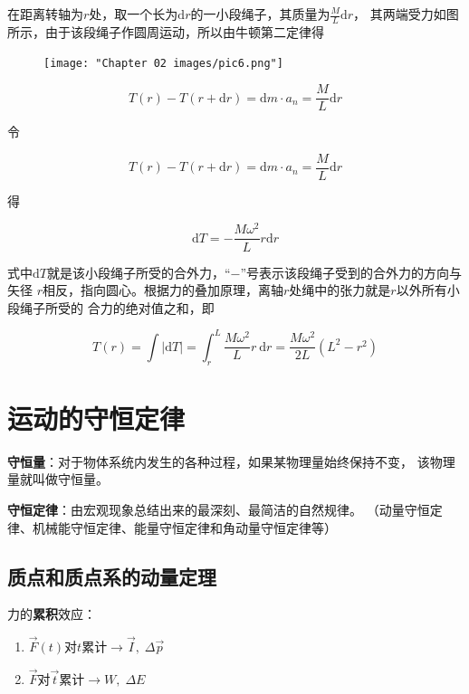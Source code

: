 \documentclass[
	12pt, %
	a4paper, %
]{myLegrandOrangeBook}
\newcommand{\rmd}{\mathrm{d}}
\begin{document}
    在距离转轴为\(r\)处，取一个长为\(\rmd r\)的一小段绳子，其质量为\(\frac{M}{L} \rmd r\)，
    其两端受力如图所示，由于该段绳子作圆周运动，所以由牛顿第二定律得

    \begin{figure}
        \centering
        \texttt{[image: "Chapter 02 images/pic6.png"]}
        \label{pic6}
    \end{figure}

    $$
        T(r)-T(r+\rmd r)=\rmd m \cdot a_n=\frac{M}{L} \rmd r
    $$

    令

    $$
        T(r)-T(r+\rmd r)=\rmd m \cdot a_n=\frac{M}{L} \rmd r
    $$

    得

    $$
        \rmd T=-\frac{M \omega^2}{L} r \rmd r
    $$

    式中\(\rmd T\)就是该小段绳子所受的合外力，“\(-\)”号表示该段绳子受到的合外力的方向与矢径
    \(r\)相反，指向圆心。根据力的叠加原理，离轴\(r\)处绳中的张力就是\(r\)以外所有小段绳子所受的
    合力的绝对值之和，即

    $$
        T(r)=\int|\mathrm{d} T|=\int_r^L \frac{M \omega^2}{L} r \mathrm{~d} r=\frac{M \omega^2}{2 L}\left(L^2-r^2\right)
    $$

\chapterspaceabove{6.25cm} %
\chapterspacebelow{7.5cm} %

\chapter{运动的守恒定律}

    \textbf{守恒量}：对于物体系统内发生的各种过程，如果某物理量始终保持不变，
    该物理量就叫做守恒量。

    \textbf{守恒定律}：由宏观现象总结出来的最深刻、最简洁的自然规律。
    （动量守恒定律、机械能守恒定律、能量守恒定律和角动量守恒定律等）

\section{质点和质点系的动量定理}

    力的\textbf{累积}效应：

    \begin{enumerate}
        \item \(\overrightarrow{F}\left(t\right)\)对\(t\)累计\(\rightarrow \overrightarrow{I},\; \Delta \overrightarrow{p}\)
        \item \(\overrightarrow{F}\)对\(\overrightarrow{t}\)累计\(\rightarrow W,\; \Delta E\)
    \end{enumerate}
\end{document}
